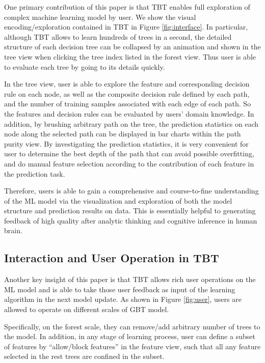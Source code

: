 \documentclass{chi2009}
\begin{document}
One primary contribution of this paper is that TBT enables full exploration of complex machine learning model by user. We show the visual encoding/exploration contained in TBT in Figure \ref{fig:interface}. In particular, although TBT allows to learn hundreds of trees in a second, the detailed structure of each decision tree can be collapsed by an animation and shown in the tree view when clicking the tree index listed in the forest view. Thus user is able to evaluate each tree by going to its details quickly. 

In the tree view, user is able to explore the feature and corresponding decision rule on each node, as well as the composite decision rule defined by each path, and the number of training samples associated with each edge of each path. So the features and decision rules can be evaluated by users' domain knowledge. In addition, by brushing arbitrary path on the tree, the prediction statistics on each node along the selected path can be displayed in bar charts within the path purity view. By investigating the prediction statistics, it is very convenient for user to determine the best depth of the path that can avoid possible overfitting, and do manual feature selection according to the contribution of each feature in the prediction task.

Therefore, users is able to gain a comprehensive and course-to-fine understanding of the ML model via the visualization and exploration of both the model structure and prediction results on data. This is essentially helpful to generating feedback of high quality after analytic thinking and cognitive inference in human brain. 

\subsection{Interaction and User Operation in TBT}

Another key insight of this paper is that TBT allows rich user operations on the ML model and is able to take those user feedback as input of the learning algorithm in the next model update. As shown in Figure \ref{fig:user}, users are allowed to operate on different scales of GBT model. 

Specifically, on the forest scale, they can remove/add arbitrary number of trees to the model. In addition, in any stage of learning process, user can define a subset of features by ``allow/block features'' in the feature view, such that all any feature selected in the rest trees are confined in the subset. 
\end{document}
